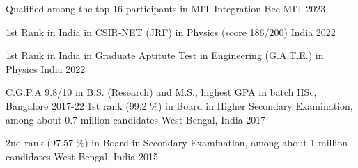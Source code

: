




\begin{cvhonors}

 \cvhonor
{} %
{Qualified among the top 16 participants in MIT Integration Bee} %
{MIT} %
{2023} %

 \cvhonor
{1st Rank in India} %
{in CSIR-NET (JRF) in Physics (score 186/200)} %
{India} %
{2022} %

 \cvhonor
{1st Rank in India} %
{in Graduate Aptitute Test in Engineering (G.A.T.E.) in Physics} %
{India} %
{2022} %

  \cvhonor
{C.G.P.A} %
{9.8/10 in B.S. (Research) and M.S., highest GPA in batch} %
{IISc, Bangalore} %
{2017-22} %
  \cvhonor
    {1st rank (99.2 \%) in Board} %
    {in Higher Secondary Examination, among about 0.7 million candidates} %
    {West Bengal, India} %
    {2017} %


	 


  \cvhonor
    {2nd rank (97.57 \%) in Board} %
    {in Secondary Examination, among about 1 million candidates} %
    {West Bengal, India} %
    {2015} %

\end{cvhonors}

